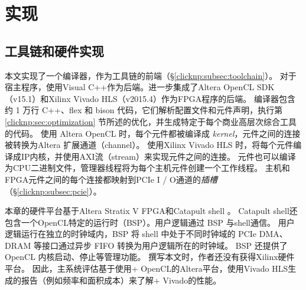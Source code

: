 \section{实现}
\label{clicknp:sec:impl}

\subsection{\name 工具链和硬件实现}

本文实现了一个\name 编译器，作为\name 工具链的前端（\S \ref {clicknp:subsec:toolchain}）。
对于宿主程序，使用Visual C++作为后端。进一步集成了Altera OpenCL SDK（v15.1）\cite {aoc}和Xilinx Vivado HLS（v2015.4）\cite {vivado}作为FPGA程序的后端。
\name 编译器包含约 1 万行 C++、flex 和 bison 代码，它们解析配置文件和元件声明，执行第 \ref {clicknp:sec:optimization} 节所述的优化，并生成特定于每个商业高层次综合工具的代码。
使用 Altera OpenCL 时，每个\name 元件都被编译成 \textit {kernel}，元件之间的连接被转换为Altera 扩展通道（channel）。
使用Xilinx Vivado HLS 时，将每个元件编译成IP内核，并使用AXI流（stream）来实现元件之间的连接。
元件也可以编译为CPU二进制文件，管理器线程将为每个主机元件创建一个工作线程。
主机和FPGA元件之间的每个连接都映射到PCIe I / O通道的\textit {插槽}（\S \ref {clicknp:subsec:pcie}）。

本章的硬件平台基于Altera Stratix V FPGA和Catapult shell \cite {putnam2014reconfigurable}。
Catapult shell还包含一个OpenCL特定的运行时（BSP）。\name 用户逻辑通过 BSP 与shell通信。
\name 用户逻辑运行在独立的时钟域内，BSP 将 shell 中处于不同时钟域的 PCIe DMA、DRAM 等接口通过异步 FIFO 转换为用户逻辑所在的时钟域。
BSP 还提供了 OpenCL 内核启动、停止等管理功能。
撰写本文时，作者还没有获得Xilinx硬件平台。
因此，主系统评估基于使用\name + OpenCL的Altera平台，使用Vivado HLS生成的报告（例如频率和面积成本）来了解\name + Vivado的性能。

